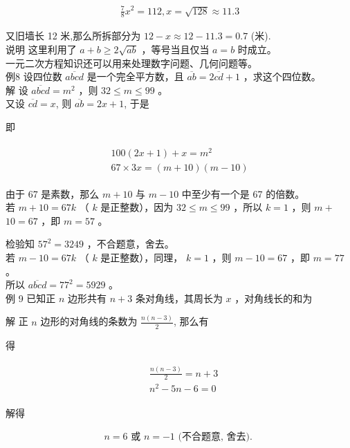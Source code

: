 \documentclass[10pt]{article}
\begin{document}
\begin{align*}
\frac{7}{8} x^{2}=112, x=\sqrt{128} \approx 11.3
\end{align*}

又旧墙长 12 米,那么所拆部分为 $12-x \approx 12-11.3=0.7$ (米).\\
说明 这里利用了 $a+b \geqslant 2 \sqrt{a b}$ ，等号当且仅当 $a=b$ 时成立。\\
一元二次方程知识还可以用来处理数字问题、几何问题等。\\
例8 设四位数 $\overline{a b c d}$ 是一个完全平方数，且 $\overline{a b}=2 \overline{c d}+1$ ，求这个四位数。\\
解 设 $\overline{a b c d}=m^{2}$ ，则 $32 \leqslant m \leqslant 99$ 。\\
又设 $\overline{c d}=x$, 则 $\overline{a b}=2 x+1$, 于是

即

\begin{align*}
\begin{gathered}
100(2 x+1)+x=m^{2} \\
67 \times 3 x=(m+10)(m-10)
\end{gathered}
\end{align*}

由于 67 是素数，那么 $m+10$ 与 $m-10$ 中至少有一个是 67 的倍数。\\
若 $m+10=67 k$ （ $k$ 是正整数），因为 $32 \leqslant m \leqslant 99$ ，所以 $k=1$ ，则 $m+$ $10=67$ ，即 $m=57$ 。

检验知 $57^{2}=3249$ ，不合题意，舍去。\\
若 $m-10=67 k$ （ $k$ 是正整数），同理， $k=1$ ，则 $m-10=67$ ，即 $m=77$ 。\\
所以 $\overline{a b c d}=77^{2}=5929$ 。\\
例 9 已知正 $n$ 边形共有 $n+3$ 条对角线，其周长为 $x$ ，对角线长的和为

解 正 $n$ 边形的对角线的条数为 $\frac{n(n-3)}{2}$, 那么有

得

\begin{align*}
\begin{aligned}
& \frac{n(n-3)}{2}=n+3 \\
& n^{2}-5 n-6=0
\end{aligned}
\end{align*}

解得

\begin{align*}
n=6 \text { 或 } n=-1 \text { (不合题意, 舍去). }
\end{align*}
\end{document}

